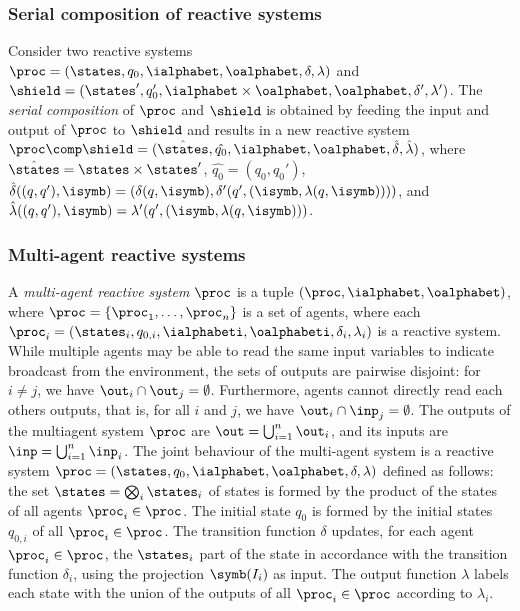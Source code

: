 \subsubsection{Serial composition of reactive systems}
Consider two reactive systems  $\proc = (\states,q_{0},\ialphabet,\oalphabet,\delta,\lambda)$ and $\shield = (\states', q_{0}',\ialphabet\times\oalphabet, \oalphabet,\delta',\lambda')$.
The \emph{serial composition} of $\proc$ and $\shield$ is obtained by feeding the input and output of $\proc$ to $\shield$ and results in a new reactive system $\proc \comp \shield=(\hat{\states}, \hat{q_{0}}, \ialphabet,\oalphabet, \hat{\delta},
\hat{\lambda})$, where
   $\hat{\states} = \states \times \states'$,
   $\hat{q_{0}} = (q_{0}, q_{0}')$,
   $\hat{\delta}((q,q'),\isymb) = (\delta(q,\isymb), \delta'(q',(\isymb,\lambda(q,\isymb))))$, and
   $\hat{\lambda}((q,q'),\isymb) = \lambda'(q',(\isymb,\lambda(q, \isymb)))$.

   
\subsubsection{Multi-agent reactive systems}
A \emph{multi-agent reactive system} $\proc$ is a tuple $(\proc, \ialphabet,  \oalphabet)$, where $\proc = \{\proc_1,\ldots,\proc_n\}$ is a set of agents, where each $\proc_i = (\states_i, q_{0,i},\ialphabeti,\oalphabeti,\delta_i,\lambda_i)$ is a reactive system.
%
While multiple agents may be able to read the same input variables to indicate
broadcast from the environment, the sets of outputs are pairwise disjoint: for $i \neq j$, we have $\out_i \cap \out_j = \emptyset$. Furthermore, agents cannot directly read each others outputs, that is, for all $i$ and $j$, we have $\out_i \cap \inp_j = \emptyset$. The outputs of the multiagent system  $\proc$ are $\out = \bigcup_{i=1}^n \out_i$, and its inputs are $\inp  = \bigcup_{i=1}^n \inp_i$.
%
The joint behaviour of the multi-agent system is a reactive system 
$\proc=(\states, q_{0}, \ialphabet,\oalphabet, \delta,
\lambda)$ defined as follows: the set $\states = \bigotimes_i \states_i$ of states is formed by the product of
the states of all agents $\proc_i \in \proc$. The initial state $q_{0}$ is formed
by the initial states $q_{0,i}$ of all $\proc_i \in \proc$. The transition function $\delta$ updates, for each agent $\proc_i \in \proc$, the $\states_i$ part of the state in accordance with the transition function $\delta_i$, using
the projection $\symb(I_i)$ as input. The output function $\lambda$ labels each state with the
union of the outputs of all $\proc_i \in \proc$ according to $\lambda_i$.



